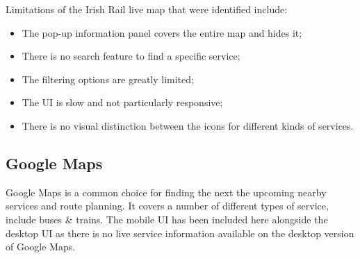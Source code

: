 \documentclass[a4paper,11pt]{report}
\begin{document}
Limitations of the Irish Rail live map that were identified include:
\begin{itemize}
    \item   The pop-up information panel covers the entire map and hides it;
    \item   There is no search feature to find a specific service;
    \item   The filtering options are greatly limited;
    \item   The UI is slow and not particularly responsive;
    \item   There is no visual distinction between the icons for different kinds of services.
\end{itemize}

\subsection{Google Maps}
Google Maps\supercite{gmaps} is a common choice for finding the next the upcoming nearby services and route planning.
It covers a number of different types of service, include buses \& trains.
The mobile UI has been included here alongside the desktop UI as there is no live service information available on the desktop version of Google Maps.
\end{document}
